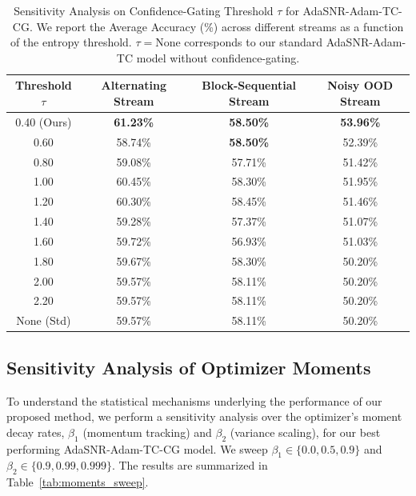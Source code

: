 \documentclass{article}
\theoremstyle{plain}
\theoremstyle{definition}
\theoremstyle{remark}
\begin{document}
\begin{table}[t]
\caption{Sensitivity Analysis on Confidence-Gating Threshold $\tau$ for AdaSNR-Adam-TC-CG. We report the Average Accuracy (\%) across different streams as a function of the entropy threshold. $\tau = \text{None}$ corresponds to our standard AdaSNR-Adam-TC model without confidence-gating.}
\label{tab:threshold_sweep}
\vskip 0.15in
\begin{center}
\begin{small}
\begin{tabular}{cccc}
\toprule
\textbf{Threshold $\tau$} & \textbf{Alternating Stream} & \textbf{Block-Sequential Stream} & \textbf{Noisy OOD Stream} \\
\midrule
0.40 (Ours) & \textbf{61.23\%} & \textbf{58.50\%} & \textbf{53.96\%} \\
0.60 & 58.74\% & \textbf{58.50\%} & 52.39\% \\
0.80 & 59.08\% & 57.71\% & 51.42\% \\
1.00 & 60.45\% & 58.30\% & 51.95\% \\
1.20 & 60.30\% & 58.45\% & 51.46\% \\
1.40 & 59.28\% & 57.37\% & 51.07\% \\
1.60 & 59.72\% & 56.93\% & 51.03\% \\
1.80 & 59.67\% & 58.30\% & 50.20\% \\
2.00 & 59.57\% & 58.11\% & 50.20\% \\
2.20 & 59.57\% & 58.11\% & 50.20\% \\
\midrule
None (Std) & 59.57\% & 58.11\% & 50.20\% \\
\bottomrule
\end{tabular}
\end{small}
\end{center}
\vskip -0.1in
\end{table}

\subsection{Sensitivity Analysis of Optimizer Moments}
To understand the statistical mechanisms underlying the performance of our proposed method, we perform a sensitivity analysis over the optimizer's moment decay rates, $\beta_1$ (momentum tracking) and $\beta_2$ (variance scaling), for our best performing AdaSNR-Adam-TC-CG model. We sweep $\beta_1 \in \{0.0, 0.5, 0.9\}$ and $\beta_2 \in \{0.9, 0.99, 0.999\}$. The results are summarized in Table~\ref{tab:moments_sweep}.
\end{document}
